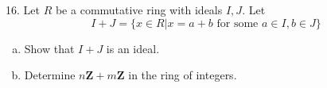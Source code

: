 \newpage
\begin{mdframed}[style=darkQuesion]
  16. Let $R$ be a commutative ring with ideals $I, J .$ Let
$$
I+J=\{x \in R | x=a+b \text { for some } a \in I, b \in J\}
$$
  \begin{enumerate}[(a)]
  \item{Show that $I+J$ is an ideal.}
\item{Determine $n \mathbf{Z}+m \mathbf{Z}$ in the ring of integers.}
\end{enumerate} 
\end{mdframed}
\begin{mdframed}[style=darkAnswer,frametitle={Joe Starr}]
\end{mdframed}
\newpage